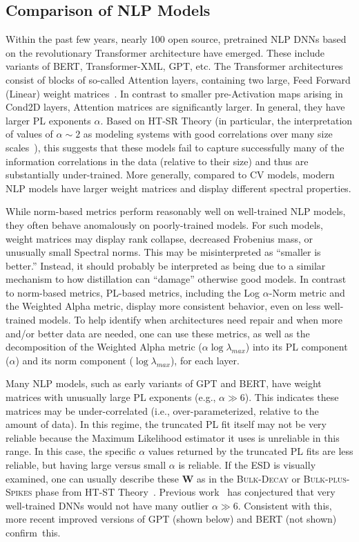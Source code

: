 \subsection{Comparison of NLP Models}
\label{sxn:nlp}

Within the past few years, nearly 100 open source, pretrained NLP DNNs based on the revolutionary Transformer architecture have emerged.
These include variants of BERT, Transformer-XML, GPT, etc.
The Transformer architectures consist of blocks of so-called Attention layers, containing two large, Feed Forward (Linear) weight matrices~\cite{Attn2017}. 
In contrast to smaller pre-Activation maps arising in Cond2D layers, Attention matrices are significantly larger.
In general, they have larger PL exponents $\alpha$.
Based on HT-SR Theory
(in particular, the interpretation of values of $\alpha \sim 2$ as modeling systems with good correlations over many size scales~\cite{BouchaudPotters03, SornetteBook}), 
this suggests that these models fail to capture successfully many of the information correlations in the data (relative to their size) and thus are substantially under-trained.
More generally, compared to CV models,
modern NLP models have larger weight matrices and display different spectral properties.

While norm-based metrics perform reasonably well on well-trained NLP models, they often behave anomalously on poorly-trained models.
For such models, weight matrices may display rank collapse, decreased Frobenius mass, or unusually small Spectral norms.
This may be misinterpreted as ``smaller is better.'' 
Instead, it should probably be interpreted as being due to a similar mechanism to how distillation can ``damage'' otherwise good models.
In contrast to norm-based metrics, PL-based metrics, including the Log $\alpha$-Norm metric and the Weighted Alpha metric, display more consistent behavior, even on less well-trained models.
To help identify when architectures need repair and when more and/or better data are needed,
one can use these metrics, 
as well as the decomposition of the Weighted Alpha metric ($\alpha\log\lambda_{max}$) into its PL component ($\alpha$) and its norm component ($\log\lambda_{max}$), for each layer.

Many NLP models, such as early variants of GPT and BERT, have weight matrices with unusually large PL exponents (e.g., $\alpha\gg 6$).
This indicates these matrices may be under-correlated (i.e., over-parameterized, relative to the amount of data).
In this regime, the truncated PL fit itself may not be very reliable because the Maximum Likelihood estimator it uses is unreliable in this range.
In this case, the specific $\alpha$ values returned by the truncated PL fits are less reliable, but having large versus small $\alpha$ is reliable.
If the ESD is visually examined, one can usually describe these $\mathbf{W}$ as in the \textsc{Bulk-Decay} or \textsc{Bulk-plus-Spikes} phase from HT-ST Theory~\cite{MM18_TR,MM19_HTSR_ICML}.
Previous work~\cite{MM18_TR,MM19_HTSR_ICML} has conjectured that very well-trained DNNs would not have many outlier $\alpha\gg 6$.
Consistent with this, more recent improved versions of GPT (shown below) and BERT (not shown) confirm~this.


